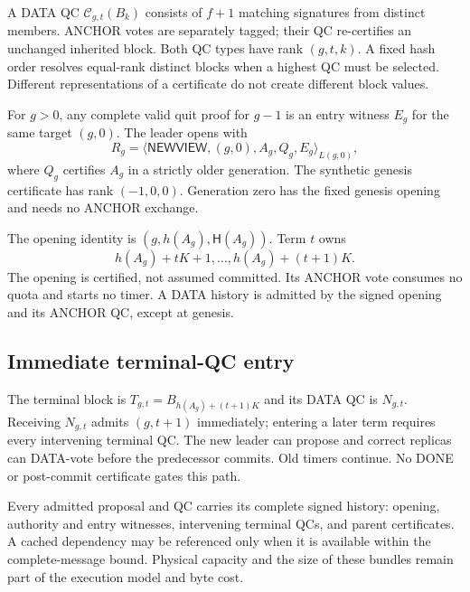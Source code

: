 \documentclass[11pt,a4paper]{article}
\newcommand{\QC}{\mathcal C}
\newcommand{\Hash}{\mathsf H}
\newcommand{\tagg}[1]{\mathsf{#1}}
\begin{document}
A DATA QC $\QC_{g,t}(B_k)$ consists of $f+1$ matching signatures from
distinct members. ANCHOR votes are separately tagged; their QC
re-certifies an unchanged inherited block. Both QC types have rank
$(g,t,k)$. A fixed hash order resolves equal-rank distinct blocks when a
highest QC must be selected. Different representations of a certificate
do not create different block values.

For $g>0$, any complete valid quit proof for $g-1$ is an entry witness
$E_g$ for the same target $(g,0)$. The leader opens with
\[
 R_g=\langle\tagg{NEWVIEW},(g,0),A_g,Q_g,E_g\rangle_{L(g,0)},
\]
where $Q_g$ certifies $A_g$ in a strictly older generation. The synthetic
genesis certificate has rank $(-1,0,0)$. Generation zero has the fixed
genesis opening and needs no ANCHOR exchange.

The opening identity is $(g,h(A_g),\Hash(A_g))$. Term $t$ owns
\[
 h(A_g)+tK+1,\ldots,h(A_g)+(t+1)K.
\]
The opening is certified, not assumed committed. Its ANCHOR vote consumes
no quota and starts no timer. A DATA history is admitted by the signed
opening and its ANCHOR QC, except at genesis.

\subsection{Immediate terminal-QC entry}
\label{sec:normal}
The terminal block is $T_{g,t}=B_{h(A_g)+(t+1)K}$ and its DATA QC is
$N_{g,t}$. Receiving $N_{g,t}$ admits $(g,t+1)$ immediately; entering a
later term requires every intervening terminal QC. The new leader can
propose and correct replicas can DATA-vote before the predecessor commits.
Old timers continue. No DONE or post-commit certificate gates this path.

Every admitted proposal and QC carries its complete signed history:
opening, authority and entry witnesses, intervening terminal QCs, and
parent certificates. A cached dependency may be referenced only when it
is available within the complete-message bound. Physical capacity and
the size of these bundles remain part of the execution model and byte cost.
\end{document}
